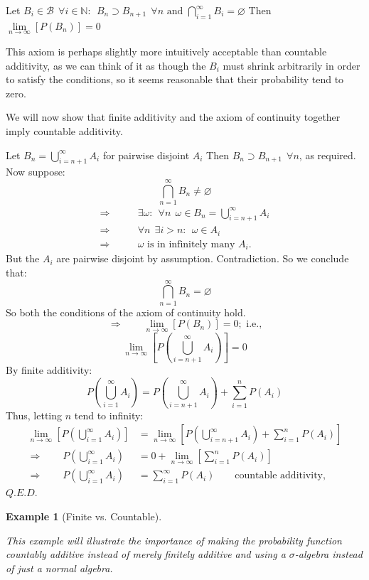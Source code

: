 \documentclass[12pt,a4paper]{article}
\newtheorem{ex}[thm]{Example}
\begin{document}
 Let $B_i\in\mathcal{B}\:\:\forall i\in\mathbb{N}:\:\:B_n\supset B_{n+1}\:\:\forall n \text{ and }\bigcap\limits_{i=1}^{\infty}B_i=\varnothing$ Then $\lim\limits_{n\rightarrow\infty}[P(B_n)]=0$\par
\vspace{12pt}

This axiom is perhaps slightly more intuitively acceptable than countable additivity, as we can think of it as though the $B_i$ must shrink arbitrarily in order to satisfy the conditions, so it seems reasonable that their probability tend to zero.

We will now show that finite additivity and the axiom of continuity together imply countable additivity.\par
Let $B_n=\bigcup_{i=n+1}^{\infty}A_i$ for pairwise disjoint $A_i$ Then $B_{n}\supset B_{n+1}\:\:\forall n$, as required. Now suppose:
$$\bigcap_{n=1}^{\infty}B_n\neq\varnothing$$
\begin{align*}
\Rightarrow&\qquad\exists\omega :\:\:\forall n\:\:\omega\in B_n=\bigcup_{i=n+1}^{\infty}A_i\\
\Rightarrow&\qquad\forall n\:\:\exists i>n:\:\:\omega\in A_i\\
\Rightarrow&\qquad\omega \text{ is in infinitely many }A_i.
\end{align*}
But the $A_i$ are pairwise disjoint by assumption. Contradiction. So we conclude that:
$$\bigcap_{n=1}^{\infty}B_n =\varnothing$$
So both the conditions of the axiom of continuity hold.
$$\Rightarrow\qquad \lim_{n\rightarrow\infty}[P(B_n)]=0;\text{ i.e.,}$$
$$\lim_{n\rightarrow\infty}[P(\bigcup_{i=n+1}^{\infty}A_i)]=0$$
By finite additivity:
$$P(\bigcup_{i=1}^{\infty}A_i) = P(\bigcup_{i=n+1}^{\infty}A_i) + \sum_{i=1}^{n}P(A_i)$$
Thus, letting $n$ tend to infinity:
\begin{align*}
\lim_{n\rightarrow\infty}[P(\bigcup_{i=1}^{\infty}A_i)] &= \lim_{n\rightarrow\infty}[P(\bigcup_{i=n+1}^{\infty}A_i) + \sum_{i=1}^{n}P(A_i)] \\
\Rightarrow\qquad P(\bigcup_{i=1}^{\infty}A_i) &= 0 + \lim_{n\rightarrow\infty}[\sum_{i=1}^{n}P(A_i)] \\
\Rightarrow\qquad P(\bigcup_{i=1}^{\infty}A_i) &= \sum_{i=1}^{\infty}P(A_i)\qquad\text{countable additivity,}
\end{align*}\hfill $Q.E.D.$

\begin{ex}[Finite vs. Countable]$\;$\par
\vspace{12pt}

This example will illustrate the importance of making the probability function countably additive instead of merely finitely additive and using a $\sigma$-algebra instead of just a normal algebra.
\end{ex}
\end{document}
